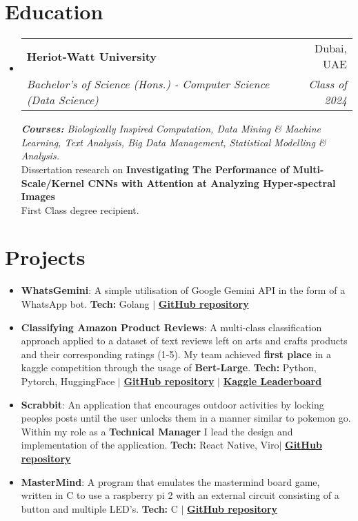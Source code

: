 \documentclass[a4paper,30pt]{article}
\makeatletter
\newcommand{\resumeItem}[2] {
	\item\small{
		\textbf{#1}{: #2 \vspace{-2pt}}
	}
}
\newcommand{\resumeSubheading}[4] {
	\vspace{-1pt}\item
	\begin{tabular*}{0.97\textwidth}{l@{\extracolsep{\fill}}r}
		\textbf{#1} & #2 \\
		\textit{#3} & \textit{#4} \\
	\end{tabular*}\vspace{-5pt}
}
\newcommand{\resumeSubItem}[2]{\resumeItem{#1}{#2}\vspace{-3pt}}
\newcommand{\resumeSubHeadingListStart}{\begin{itemize}[leftmargin=*]}
\newcommand{\resumeSubHeadingListEnd}{\end{itemize}}
\makeatother
\begin{document}
\section{Education}
\resumeSubHeadingListStart
	\resumeSubheading{Heriot-Watt University}{Dubai, UAE}{Bachelor's of Science (Hons.) - Computer Science (Data Science)}{Class of 2024}
	{\scriptsize \textit{ \footnotesize{\newline{}\textbf{Courses:} Biologically Inspired Computation, Data Mining \& Machine Learning, Text Analysis, Big Data Management, Statistical Modelling \& Analysis.}}}
	\\
	Dissertation research on \textbf{Investigating The Performance of Multi-Scale/Kernel CNNs with Attention at Analyzing Hyper-spectral Images}
	\\
	First Class degree recipient.
\resumeSubHeadingListEnd

\section{Projects}
	\resumeSubHeadingListStart
        \resumeSubItem{WhatsGemini}{A simple utilisation of Google Gemini API in the form of a WhatsApp bot. \textbf{Tech:} Golang $\vert$ \href{https://github.com/asa30/WhatsGemini}{\textbf{GitHub repository}}}
        \resumeSubItem{Classifying Amazon Product Reviews}{A multi-class classification approach applied to a dataset of text reviews left on arts and crafts products and their corresponding ratings (1-5). My team achieved \textbf{first place} in a kaggle competition through the usage of \textbf{Bert-Large}.
        \textbf{Tech:} Python, Pytorch, HuggingFace
        $\vert$
        \href{https://github.com/fgs2/kaggle-comp-2024}{\textbf{GitHub repository}}
        $\vert$
        \href{https://www.kaggle.com/competitions/f20f21-aa-2023-2024-cw2/leaderboard}{\textbf{Kaggle Leaderboard}}
        }
		\resumeSubItem{Scrabbit}{ An application that encourages outdoor activities by locking peoples posts until the user unlocks them in a manner similar to pokemon go. Within my role as a \textbf{Technical Manager} I lead the design and implementation of the application.  \textbf{Tech:} React Native, Viro$\vert$ \href{https://github.com/Aucta-Studio/Scrabbit-expo}{\textbf{GitHub repository}}}
		\vspace{2pt}
		\resumeSubItem{MasterMind}{ A program that emulates the mastermind board game, written in C to use a raspberry pi 2 with an external circuit consisting of a button and multiple LED's. \textbf{Tech:} C $\vert$ \href{https://github.com/asa30/MasterMind}{\textbf{GitHub repository}}}
		\vspace{2pt}
	\resumeSubHeadingListEnd
	\vspace{-5pt}
\end{document}
